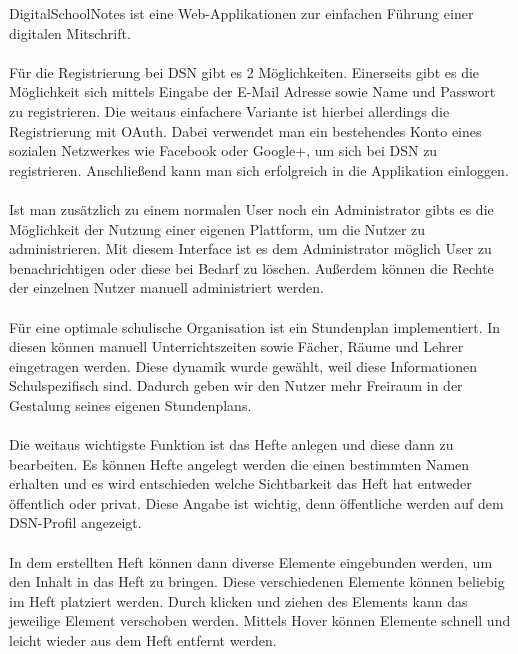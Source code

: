 DigitalSchoolNotes ist eine Web-Applikationen zur einfachen Führung einer digitalen Mitschrift.\\\\
Für die Registrierung bei DSN gibt es 2 Möglichkeiten. Einerseits gibt es die Möglichkeit sich mittels Eingabe der E-Mail Adresse sowie Name und Passwort zu registrieren. Die weitaus einfachere Variante ist hierbei allerdings die Registrierung mit OAuth. Dabei verwendet man ein bestehendes Konto eines sozialen Netzwerkes wie Facebook oder Google+, um sich bei DSN zu registrieren. Anschließend kann man sich erfolgreich in die Applikation einloggen.\\
\\
Ist man zusätzlich zu einem normalen User noch ein Administrator gibts es die Möglichkeit der Nutzung einer eigenen Plattform, um die Nutzer zu administrieren. Mit diesem Interface ist es dem Administrator möglich User zu benachrichtigen oder diese bei Bedarf zu löschen. Außerdem können die Rechte der einzelnen Nutzer manuell administriert werden.\\
\\
Für eine optimale schulische Organisation ist ein Stundenplan implementiert. In diesen können manuell Unterrichtszeiten sowie Fächer, Räume und Lehrer eingetragen werden. Diese dynamik wurde gewählt, weil diese Informationen Schulspezifisch sind. Dadurch geben wir den Nutzer mehr Freiraum in der Gestalung seines eigenen Stundenplans.\\
\\
Die weitaus wichtigste Funktion ist das Hefte anlegen und diese dann zu bearbeiten. Es können Hefte angelegt werden die einen bestimmten Namen erhalten und es wird entschieden welche Sichtbarkeit das Heft hat entweder öffentlich oder privat. Diese Angabe ist wichtig, denn öffentliche werden auf dem DSN-Profil angezeigt.\\
\\
In dem erstellten Heft können dann diverse Elemente eingebunden werden, um den Inhalt in das Heft zu bringen. Diese verschiedenen Elemente können beliebig im Heft platziert werden. Durch klicken und ziehen des Elements kann das jeweilige Element verschoben werden. Mittels Hover können Elemente schnell und leicht wieder aus dem Heft entfernt werden.\\
\\
